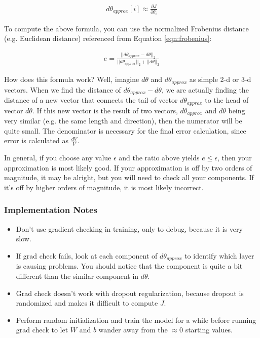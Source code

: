 \documentclass{article}
\begin{document}
\begin{align}
d\theta_{approx}[i] \approx \frac{\partial{J}}{\partial{\theta_i}}
\end{align}

To compute the above formula, you can use the normalized Frobenius distance (e.g. Euclidean distance) referenced from Equation \ref{eqn:frobenius}:

\begin{align}
e = \frac{||d\theta_{approx} - d\theta||_2}{||d\theta_{approx}||_2 + ||d\theta||_2}
\end{align}

How does this formula work?  Well, imagine $d\theta$ and $d\theta_{approx}$ as simple 2-d or 3-d vectors.  When we find the distance of $d\theta_{approx} - d\theta$, we are actually finding the distance of a new vector that connects the tail of vector $d\theta_{approx}$ to the head of vector $d\theta$.  If this new vector is the result of two vectors, $d\theta_{approx}$ and $d\theta$ being very similar (e.g. the same length and direction), then the numerator will be quite small.  The denominator is necessary for the final error calculation, since error is calculated as $\frac{dV}{V}$.

In general, if you choose any value $\epsilon$ and the ratio above yields $e \leq \epsilon$, then your approximation is most likely good.  If your approximation is off by two orders of magnitude, it may be alright, but you will need to check all your components.  If it's off by higher orders of magnitude, it is most likely incorrect.

\subsubsection{Implementation Notes}

\begin{itemize}
\item Don't use gradient checking in training, only to debug, because it is very slow.
\item If grad check fails, look at each component of $d\theta_{approx}$ to identify which layer is causing problems.  You should notice that the component is quite a bit different than the similar component in $d\theta$.
\item Grad check doesn't work with dropout regularization, because dropout is randomized and makes it difficult to compute $J$.
\item Perform random initialization and train the model for a while before running grad check to let $W$ and $b$ wander away from the $\approx 0$ starting values.
\end{itemize}
\end{document}
